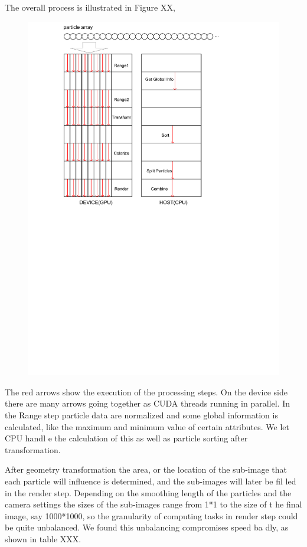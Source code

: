 The overall process is illustrated in Figure XX,
\begin{figure}
\begin{center}
\includegraphics[width=1.3\textwidth]{cu_splotch_process.pdf}
\end{center}
\end{figure}

The red arrows show the execution of the processing steps. On the device side there are 
many arrows going together as CUDA threads running in parallel. In the
 Range step particle data are normalized and some global information is calculated, 
 like the maximum and minimum value of certain attributes. We let CPU handl
e the calculation of this as well as particle sorting after transformation.

After geometry transformation the area, or the location of the sub-image that each 
particle will influence is determined, and the sub-images will later be fil
led in the render step. Depending on the smoothing length of the particles and the 
camera settings the sizes of the sub-images range from 1*1 to the size of t
he final image, say 1000*1000, so the granularity of computing tasks in render step could be quite unbalanced.  We found this unbalancing compromises speed ba
dly, as shown in table XXX.

